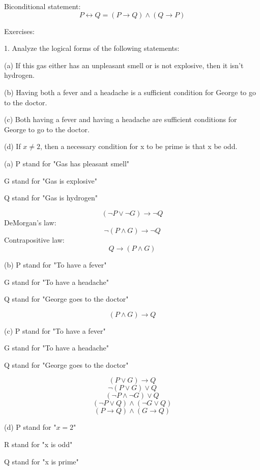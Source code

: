 \documentclass{article}
\begin{document}
Biconditional statement: $$P \leftrightarrow Q = (P \to Q) \land (Q \to P)$$
\vspace{30pt}

Exercises:

1. Analyze the logical forms of the following statements:

\hspace{12pt}(a) If this gas either has an unpleasant smell or is not explosive, then it
isn’t hydrogen.

\hspace{12pt}(b) Having both a fever and a headache is a sufficient condition for George
to go to the doctor.

\hspace{12pt}(c) Both having a fever and having a headache are sufficient conditions
for George to go to the doctor.

\hspace{12pt}(d) If $x \neq 2$, then a necessary condition for x to be prime is that x be odd.
\vspace{30pt}

(a) P stand for "Gas has pleasant smell"

G stand for "Gas is explosive"

Q stand for "Gas is hydrogen"

$$(\neg P \lor \neg G) \to \neg Q$$
DeMorgan's law: $$\neg (P \land G) \to \neg Q$$
Contrapositive law: $$Q \to (P \land G)$$
\vspace{20pt}

(b) P stand for "To have a fever"

G stand for "To have a headache"

Q stand for "George goes to the doctor"

$$(P \land G) \to Q$$
\vspace{20pt}

(c) P stand for "To have a fever"

G stand for "To have a headache"

Q stand for "George goes to the doctor"

$$(P \lor G) \to Q$$
$$\neg (P \lor G) \lor Q$$
$$(\neg P \land \neg G) \lor Q$$
$$(\neg P \lor Q) \land (\neg G \lor Q)$$
$$(P \to Q) \land (G \to Q)$$

\vspace{20pt}

(d) P stand for "$x = 2$"

R stand for "x is odd"

Q stand for "x is prime"
\end{document}
